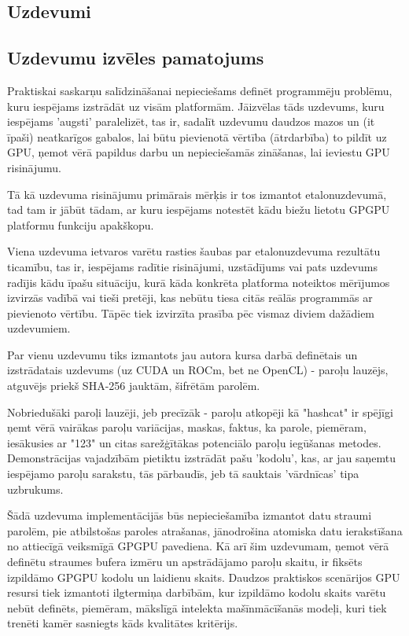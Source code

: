 \begin{center}
    \chapter{Uzdevumi}
\end{center}
\section{Uzdevumu izvēles pamatojums}
Praktiskai saskarņu salīdzināšanai nepieciešams definēt programmēju problēmu,
kuru iespējams izstrādāt uz visām platformām.  Jāizvēlas tāds uzdevums, kuru
iespējams 'augsti' paralelizēt, tas ir, sadalīt uzdevumu daudzos mazos un (it
īpaši) neatkarīgos gabalos, lai būtu pievienotā vērtība (ātrdarbība) to pildīt
uz GPU, ņemot vērā papildus darbu un nepieciešamās zināšanas, lai ieviestu GPU
risinājumu.

Tā kā uzdevuma risinājumu primārais mērķis ir tos izmantot etalonuzdevumā, tad
tam ir jābūt tādam, ar kuru iespējams notestēt kādu biežu lietotu GPGPU
platformu funkciju apakškopu.

Viena uzdevuma ietvaros varētu rasties šaubas par etalonuzdevuma rezultātu
ticamību, tas ir, iespējams radītie risinājumi, uzstādījums vai pats uzdevums
radījis kādu īpašu situāciju, kurā kāda konkrēta platforma noteiktos mērījumos
izvirzās vadībā vai tieši pretēji, kas nebūtu tiesa citās reālās programmās ar
pievienoto vērtību. Tāpēc tiek izvirzīta prasība pēc vismaz diviem dažādiem
uzdevumiem.

Par vienu uzdevumu tiks izmantots jau autora kursa darbā definētais un 
izstrādatais uzdevums (uz CUDA un ROCm, bet ne OpenCL) - paroļu lauzējs,
atguvējs priekš SHA-256 jauktām, šifrētām parolēm.\cite{kursa-darbs}

Nobriedušāki paroļi lauzēji, jeb precīzāk - paroļu atkopēji kā
"hashcat"\cite{hashcat} ir spējīgi ņemt vērā vairākas paroļu variācijas,
maskas, faktus, ka parole, piemēram, iesākusies ar "123" un citas sarežģītākas
potenciālo paroļu iegūšanas metodes. Demonstrācijas vajadzībām pietiktu
izstrādāt pašu 'kodolu', kas, ar jau saņemtu iespējamo paroļu sarakstu, tās
pārbaudīs, jeb tā sauktais 'vārdnīcas' tipa uzbrukums.\cite{hashcat_dict_atk}

Šādā uzdevuma implementācijās būs nepieciešamība izmantot datu straumi parolēm,
pie atbilstošas paroles atrašanas, jānodrošina atomiska datu ierakstīšana no
attiecīgā veiksmīgā GPGPU pavediena. Kā arī šim uzdevumam, ņemot vērā definētu
straumes bufera izmēru un apstrādājamo paroļu skaitu, ir fiksēts izpildāmo
GPGPU kodolu un laidienu skaits. Daudzos praktiskos scenārijos GPU resursi tiek
izmantoti ilgtermiņa darbībām, kur izpildāmo kodolu skaits varētu nebūt
definēts, piemēram, mākslīgā intelekta mašīnmācīšanās modeļi, kuri tiek trenēti
kamēr sasniegts kāds kvalitātes kritērijs.

